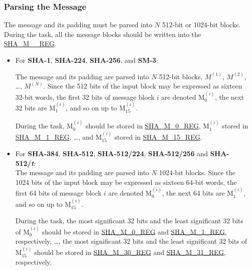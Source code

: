 \documentclass[main\_\_EN.tex]{subfiles}
\begin{document}
\subsubsection{Parsing the Message}\label{sec:sha-parsing-message}

The message and its padding must be parsed into \begin{math}N\end{math} 512-bit or 1024-bit blocks. During the task, all the message blocks should be written into the \hyperref[regdesc:SHAMNREG]{SHA\_M\_\_REG}.

\begin{itemize}
    \item For \textbf{SHA-1}, \textbf{SHA-224}, \textbf{SHA-256}, and \textbf{SM-3}: 
    
    The message and its padding are parsed into \begin{math}N\end{math} 512-bit blocks, \begin{math}M^{(1)}\end{math}, \begin{math}M^{(2)}\end{math}, \dots, \begin{math}M^{(N)}\end{math}. Since the 512 bits of the input block may be expressed as sixteen 32-bit words, the first 32 bits of message block \begin{math}i\end{math} are denoted M$^{(i)}_{0}$, the next 32 bits are M$^{(i)}_{1}$, and so on up to M$^{(i)}_{15}$.
    
    During the task, M$^{(i)}_{0}$ should be stored in \hyperref[regdesc:SHAMNREG]{SHA\_M\_0\_REG}, M$^{(i)}_1$ stored in \hyperref[regdesc:SHAMNREG]{SHA\_M\_1\_REG}, \dots, and M$^{(i)}_{15}$ stored in \hyperref[regdesc:SHAMNREG]{SHA\_M\_15\_REG}.
    
    \item For \textbf{SHA-384}, \textbf{SHA-512}, \textbf{SHA-512/224}, \textbf{SHA-512/256} and \textbf{SHA-512/{\it{t}}}: \\
    
    The message and its padding are parsed into \begin{math}N\end{math} 1024-bit blocks. Since the 1024 bits of the input block may be expressed as sixteen 64-bit words, the first 64 bits of message block \begin{math}i\end{math} are denoted M$^{(i)}_{0}$, the next 64 bits are M$^{(i)}_{1}$, and so on up to M$^{(i)}_{15}$.
    
    During the task, the most significant 32 bits and the least significant 32 bits of M$^{(i)}_0 $ should be stored in \hyperref[regdesc:SHAMNREG]{SHA\_M\_0\_REG} and \hyperref[regdesc:SHAMNREG]{SHA\_M\_1\_REG}, respectively, \dots, the most significant 32 bits and the least significant 32 bits of M$^{(i)}_{15}$ should be stored in \hyperref[regdesc:SHAMNREG]{SHA\_M\_30\_REG} and \hyperref[regdesc:SHAMNREG]{SHA\_M\_31\_REG}, respectively.
    
\end{itemize}
\end{document}

